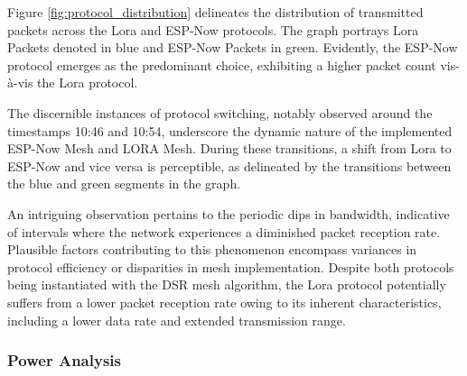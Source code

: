 Figure \ref{fig:protocol_distribution} delineates the distribution of transmitted packets across the Lora and ESP-Now protocols. The graph portrays Lora Packets denoted in blue and ESP-Now Packets in green. Evidently, the ESP-Now protocol emerges as the predominant choice, exhibiting a higher packet count vis-à-vis the Lora protocol.

The discernible instances of protocol switching, notably observed around the timestamps 10:46 and 10:54, underscore the dynamic nature of the implemented ESP-Now Mesh and LORA Mesh. During these transitions, a shift from Lora to ESP-Now and vice versa is perceptible, as delineated by the transitions between the blue and green segments in the graph.

An intriguing observation pertains to the periodic dips in bandwidth, indicative of intervals where the network experiences a diminished packet reception rate. Plausible factors contributing to this phenomenon encompass variances in protocol efficiency or disparities in mesh implementation. Despite both protocols being instantiated with the DSR mesh algorithm, the Lora protocol potentially suffers from a lower packet reception rate owing to its inherent characteristics, including a lower data rate and extended transmission range.

\subsubsection{Power Analysis}\label{sec:power_analysis}
